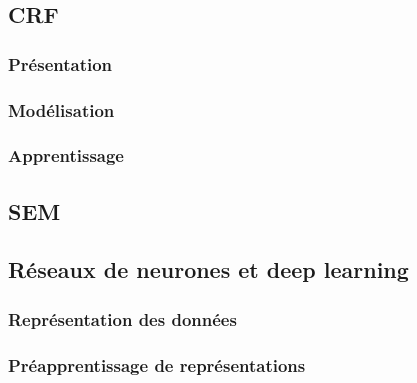 \documentclass[12pt,a4paper,times,twoside,openright]{report}
\begin{document}
        \subsection{CRF}
        \label{subsec:CRFs}
        
            \subsubsection{Présentation}
            \label{subsubsec:CRFs-introduction}
            
            
            \subsubsection{Modélisation}
            \label{subsubsec:CRFs-modelisation}
            
        
            \subsubsection{Apprentissage}
            \label{subsubsec:CRFs-training}
            
        
        \subsection{SEM}
        \label{subsec:SEM}
        
        
        \subsection{Réseaux de neurones et deep learning}
        \label{subsec:NNs}
        
        
            \subsubsection{Représentation des données}
            \label{subsubsec:nn-embeddings}
            
        
            \subsubsection{Préapprentissage de représentations}
            \label{subsubsec:word2vec}
            
        
\end{document}
